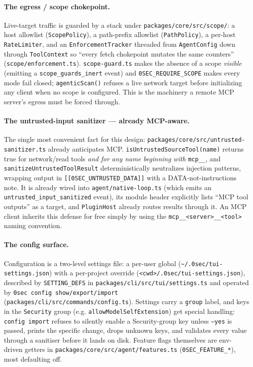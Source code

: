 \documentclass[11pt]{article}
\begin{document}
\paragraph{The egress / scope chokepoint.} Live-target traffic is guarded by a
stack under \texttt{packages/core/src/scope/}: a host allowlist
(\texttt{ScopePolicy}), a path-prefix allowlist (\texttt{PathPolicy}), a per-host
\texttt{RateLimiter}, and an \texttt{EnforcementTracker} threaded from
\texttt{AgentConfig} down through \texttt{ToolContext} so ``every fetch
chokepoint mutates the same counters''
(\texttt{scope/enforcement.ts}). \texttt{scope-guard.ts} makes the absence of a
scope \emph{visible} (emitting a \texttt{scope\_guards\_inert} event) and
\texttt{0SEC\_REQUIRE\_SCOPE} makes every mode fail closed;
\texttt{agenticScan()} refuses a live network target before initializing any
client when no scope is configured. This is the machinery a remote MCP server's
egress must be forced through.

\paragraph{The untrusted-input sanitizer --- already MCP-aware.} The single most
convenient fact for this design: \texttt{packages/core/src/untrusted-sanitizer.ts}
already anticipates MCP. \texttt{isUntrustedSourceTool(name)} returns true for
network/read tools \emph{and for any name beginning with} \texttt{mcp\_\_}, and
\texttt{sanitizeUntrustedToolResult} deterministically neutralizes injection
patterns, wrapping output in \texttt{[[0SEC\_UNTRUSTED\_DATA]]} with a
DATA-not-instructions note. It is already wired into
\texttt{agent/native-loop.ts} (which emits an \texttt{untrusted\_input\_sanitized}
event), its module header explicitly lists ``MCP tool outputs'' as a target, and
\texttt{PluginHost} already routes results through it. An MCP client inherits this
defense for free simply by using the \texttt{mcp\_\_<server>\_\_<tool>} naming
convention.

\paragraph{The config surface.} Configuration is a two-level settings file: a
per-user global (\texttt{\textasciitilde/.0sec/tui-settings.json}) with a
per-project override (\texttt{<cwd>/.0sec/tui-settings.json}), described by
\texttt{SETTING\_DEFS} in \texttt{packages/cli/src/tui/settings.ts} and operated
by \texttt{0sec config show/export/import}
(\texttt{packages/cli/src/commands/config.ts}). Settings carry a \texttt{group}
label, and keys in the \texttt{Security} group (e.g.
\texttt{allowModelSelfExtension}) get special handling: \texttt{config import}
refuses to silently enable a Security-group key unless \texttt{--yes} is passed,
prints the specific change, drops unknown keys, and validates every value
through a sanitiser before it lands on disk. Feature flags themselves are
env-driven getters in \texttt{packages/core/src/agent/features.ts}
(\texttt{0SEC\_FEATURE\_*}), most defaulting off.
\end{document}

